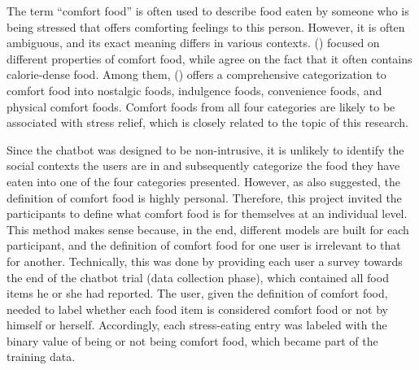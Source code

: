 The term “comfort food” is often used to describe food eaten by someone who is being stressed that offers comforting feelings to this person. However, it is often ambiguous, and its exact meaning differs in various contexts. \citeauthor{12_comfort_food_women, 14_comfort_food, 15_comfort_food_review} (\citeyear{12_comfort_food_women, 14_comfort_food, 15_comfort_food_review}) focused on different properties of comfort food, while agree on the fact that it often contains calorie-dense food. Among them, \citeauthor{14_comfort_food} (\citeyear{14_comfort_food}) offers a comprehensive categorization to comfort food into nostalgic foods, indulgence foods, convenience foods, and physical comfort foods. Comfort foods from all four categories are likely to be associated with stress relief, which is closely related to the topic of this research.

Since the chatbot was designed to be non-intrusive, it is unlikely to identify the social contexts the users are in and subsequently categorize the food they have eaten into one of the four categories \citeauthor{14_comfort_food} presented. However, as \citeauthor{14_comfort_food} also suggested, the definition of comfort food is highly personal. Therefore, this project invited the participants to define what comfort food is for themselves at an individual level. This method makes sense because, in the end, different models are built for each participant, and the definition of comfort food for one user is irrelevant to that for another. Technically, this was done by providing each user a survey towards the end of the chatbot trial (data collection phase), which contained all food items he or she had reported. The user, given the definition of comfort food, needed to label whether each food item is considered comfort food or not by himself or herself. Accordingly, each stress-eating entry was labeled with the binary value of being or not being comfort food, which became part of the training data.
